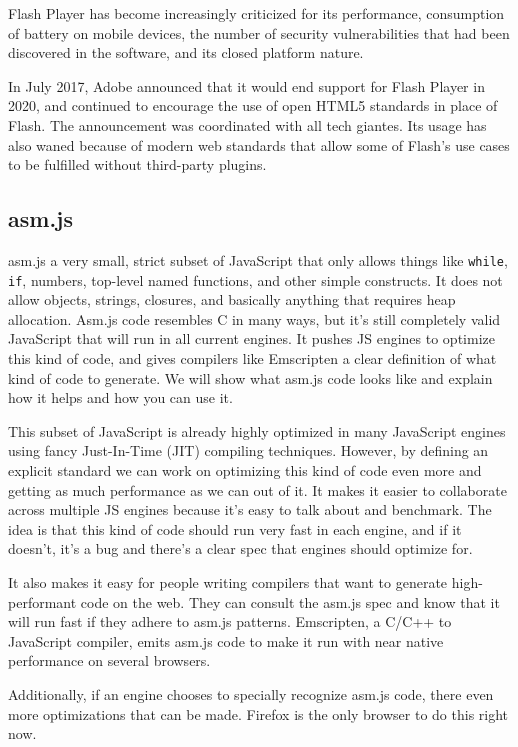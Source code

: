 Flash Player has become increasingly criticized for its performance, consumption of battery on mobile devices, the number of security vulnerabilities that had been discovered in the software, and its closed platform nature.

In July 2017, Adobe announced that it would end support for Flash Player in 2020, and continued to encourage the use of open HTML5 standards in place of Flash. 
The announcement was coordinated with all tech giantes.
Its usage has also waned because of modern web standards that allow some of Flash's use cases to be fulfilled without third-party plugins.

\subsection{asm.js} \cite{asm17}

asm.js a very small, strict subset of JavaScript that only allows things like \texttt{while}, \texttt{if}, numbers, top-level named functions, and other simple constructs. 
It does not allow objects, strings, closures, and basically anything that requires heap allocation. 
Asm.js code resembles C in many ways, but it's still completely valid JavaScript that will run in all current engines. 
It pushes JS engines to optimize this kind of code, and gives compilers like Emscripten a clear definition of what kind of code to generate. 
We will show what asm.js code looks like and explain how it helps and how you can use it.

This subset of JavaScript is already highly optimized in many JavaScript engines using fancy Just-In-Time (JIT) compiling techniques. 
However, by defining an explicit standard we can work on optimizing this kind of code even more and getting as much performance as we can out of it. 
It makes it easier to collaborate across multiple JS engines because it's easy to talk about and benchmark. 
The idea is that this kind of code should run very fast in each engine, and if it doesn't, it's a bug and there's a clear spec that engines should optimize for.

It also makes it easy for people writing compilers that want to generate high-performant code on the web. 
They can consult the asm.js spec and know that it will run fast if they adhere to asm.js patterns. 
Emscripten, a C/C++ to JavaScript compiler, emits asm.js code to make it run with near native performance on several browsers.

Additionally, if an engine chooses to specially recognize asm.js code, there even more optimizations that can be made. 
Firefox is the only browser to do this right now.

